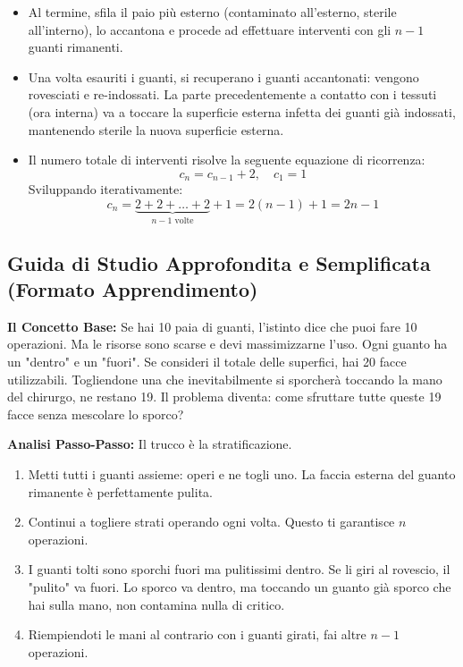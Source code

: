 \documentclass[a4paper, 11pt]{report}
\begin{document}
\begin{itemize}
\begin{itemize}
\item Al termine, sfila il paio più esterno (contaminato all'esterno, sterile all'interno), lo accantona e procede ad effettuare interventi con gli $n-1$ guanti rimanenti.
\item Una volta esauriti i guanti, si recuperano i guanti accantonati: vengono rovesciati e re-indossati. La parte precedentemente a contatto con i tessuti (ora interna) va a toccare la superficie esterna infetta dei guanti già indossati, mantenendo sterile la nuova superficie esterna.
\item Il numero totale di interventi risolve la seguente equazione di ricorrenza:
\[ c_n = c_{n-1} + 2, \quad c_1 = 1 \]
Sviluppando iterativamente:
\begin{equation*}
c_n = \underbrace{2 + 2 + \dots + 2}_{n-1 \text{ volte}} + 1 = 2(n-1) + 1 = 2n - 1
\end{equation*}
\end{itemize}
\end{itemize}

\vspace{0.5cm}
\subsection*{Guida di Studio Approfondita e Semplificata (Formato Apprendimento)}
\textbf{Il Concetto Base:}
Se hai 10 paia di guanti, l'istinto dice che puoi fare 10 operazioni. Ma le risorse sono scarse e devi massimizzarne l'uso. Ogni guanto ha un "dentro" e un "fuori". Se consideri il totale delle superfici, hai 20 facce utilizzabili. Togliendone una che inevitabilmente si sporcherà toccando la mano del chirurgo, ne restano 19. Il problema diventa: come sfruttare tutte queste 19 facce senza mescolare lo sporco?

\textbf{Analisi Passo-Passo:}
Il trucco è la stratificazione.
\begin{enumerate}
\item Metti tutti i guanti assieme: operi e ne togli uno. La faccia esterna del guanto rimanente è perfettamente pulita.
\item Continui a togliere strati operando ogni volta. Questo ti garantisce $n$ operazioni.
\item I guanti tolti sono sporchi fuori ma pulitissimi dentro. Se li giri al rovescio, il "pulito" va fuori. Lo sporco va dentro, ma toccando un guanto già sporco che hai sulla mano, non contamina nulla di critico.
\item Riempiendoti le mani al contrario con i guanti girati, fai altre $n-1$ operazioni.
\end{enumerate}
\end{document}
